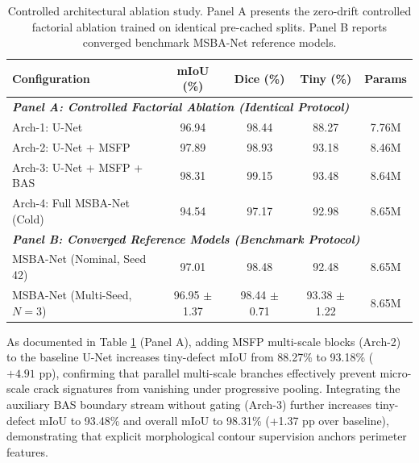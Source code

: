 \documentclass{ieeeaccess}
\begin{document}
\begin{table}[!t]
\centering
\setlength{\tabcolsep}{1.2pt}
\fontsize{6.8pt}{8.8pt}\selectfont
\caption{Controlled architectural ablation study. Panel A presents the zero-drift controlled factorial ablation trained on identical pre-cached splits. Panel B reports converged benchmark MSBA-Net reference models.}
\label{tab:ablation}
\begin{tabular*}{\columnwidth}{@{\extracolsep{\fill}}lcccc@{}}
\toprule
\textbf{Configuration} & \textbf{mIoU (\%)} & \textbf{Dice (\%)} & \textbf{Tiny (\%)} & \textbf{Params} \\
\midrule
\multicolumn{5}{l}{\textit{\textbf{Panel A: Controlled Factorial Ablation (Identical Protocol)}}} \\
Arch-1: U-Net \cite{ronneberger2015unet} & 96.94 & 98.44 & 88.27 & 7.76M \\
Arch-2: U-Net + MSFP & 97.89 & 98.93 & 93.18 & 8.46M \\
Arch-3: U-Net + MSFP + BAS & 98.31 & 99.15 & 93.48 & 8.64M \\
Arch-4: Full MSBA-Net (Cold) & 94.54 & 97.17 & 92.98 & 8.65M \\
\midrule
\multicolumn{5}{l}{\textit{\textbf{Panel B: Converged Reference Models (Benchmark Protocol)}}} \\
MSBA-Net (Nominal, Seed 42) & 97.01 & 98.48 & 92.48 & 8.65M \\
MSBA-Net (Multi-Seed, $N=3$) & 96.95 $\pm$ 1.37 & 98.44 $\pm$ 0.71 & 93.38 $\pm$ 1.22 & 8.65M \\
\bottomrule
\end{tabular*}
\end{table}

As documented in Table \ref{tab:ablation} (Panel A), adding MSFP multi-scale blocks (Arch-2) to the baseline U-Net increases tiny-defect mIoU from 88.27\% to 93.18\% ($+4.91\text{ pp}$), confirming that parallel multi-scale branches effectively prevent micro-scale crack signatures from vanishing under progressive pooling. Integrating the auxiliary BAS boundary stream without gating (Arch-3) further increases tiny-defect mIoU to 93.48\% and overall mIoU to 98.31\% (+1.37 pp over baseline), demonstrating that explicit morphological contour supervision anchors perimeter features. 
\end{document}

